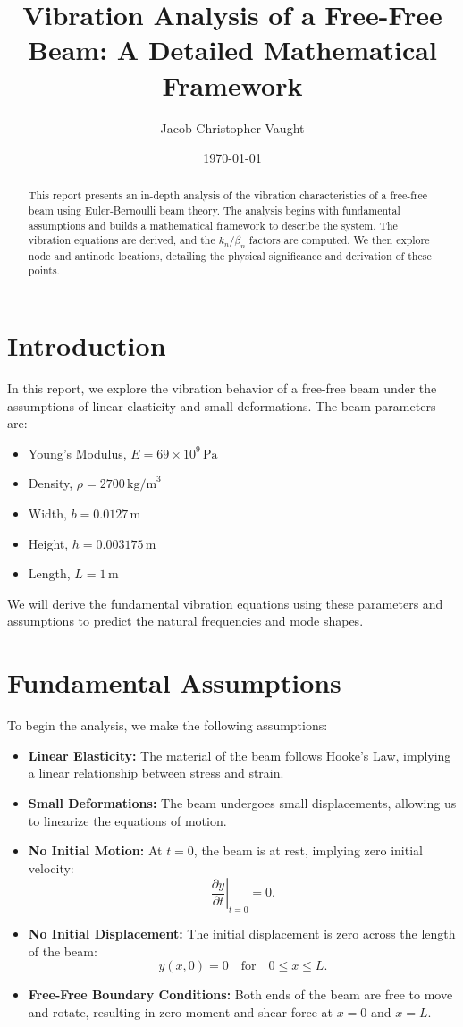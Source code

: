 \documentclass[12pt,a4paper]{article}
\title{Vibration Analysis of a Free-Free Beam: A Detailed Mathematical Framework}
\author{Jacob Christopher Vaught}
\date{\today}
\begin{document}
\maketitle

\begin{abstract}
This report presents an in-depth analysis of the vibration characteristics of a free-free beam using Euler-Bernoulli beam theory. The analysis begins with fundamental assumptions and builds a mathematical framework to describe the system. The vibration equations are derived, and the \( k_n/\beta_n \) factors are computed. We then explore node and antinode locations, detailing the physical significance and derivation of these points.
\end{abstract}

\section{Introduction}
In this report, we explore the vibration behavior of a free-free beam under the assumptions of linear elasticity and small deformations. The beam parameters are:
\begin{itemize}
    \item Young's Modulus, \( E = 69 \times 10^9 \, \text{Pa} \)
    \item Density, \( \rho = 2700 \, \text{kg/m}^3 \)
    \item Width, \( b = 0.0127 \, \text{m} \)
    \item Height, \( h = 0.003175 \, \text{m} \)
    \item Length, \( L = 1 \, \text{m} \)
\end{itemize}

We will derive the fundamental vibration equations using these parameters and assumptions to predict the natural frequencies and mode shapes.

\section{Fundamental Assumptions}
To begin the analysis, we make the following assumptions:
\begin{itemize}
    \item \textbf{Linear Elasticity:} The material of the beam follows Hooke's Law, implying a linear relationship between stress and strain.
    \item \textbf{Small Deformations:} The beam undergoes small displacements, allowing us to linearize the equations of motion.
    \item \textbf{No Initial Motion:} At \( t = 0 \), the beam is at rest, implying zero initial velocity: 
    \[
    \left. \frac{\partial y}{\partial t} \right|_{t=0} = 0.
    \]
    \item \textbf{No Initial Displacement:} The initial displacement is zero across the length of the beam:
    \[
    y(x, 0) = 0 \quad \text{for} \quad 0 \leq x \leq L.
    \]
    \item \textbf{Free-Free Boundary Conditions:} Both ends of the beam are free to move and rotate, resulting in zero moment and shear force at \( x = 0 \) and \( x = L \).
\end{itemize}
\end{document}
